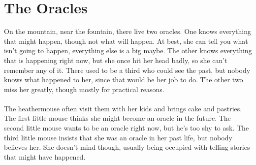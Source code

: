 \documentclass[11pt]{article}
\begin{document}
\newpage
\section*{The Oracles}

On the mountain, near the fountain, there live two oracles. One knows everything that might happen, though not what will happen. At best, she can tell you what isn't going to happen, everything else is a big maybe. The other knows everything that is happening right now, but she once hit her head badly, so she can't remember any of it. There used to be a third who could see the past, but nobody knows what happened to her, since that would be her job to do. The other two miss her greatly, though mostly for practical reasons.\\
\\
The heathermouse often visit them with her kids and brings cake and pastries. The first little mouse thinks she might become an oracle in the future. The second little mouse wants to be an oracle right now, but he's too shy to ask. The third little mouse insists that she was an oracle in her past life, but nobody believes her. She doesn't mind though, usually being occupied with telling stories that might have happened.
\end{document}
